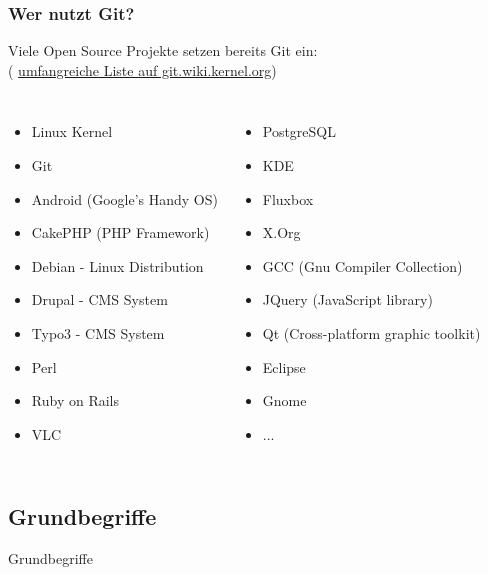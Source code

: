 \documentclass{beamer}
\begin{document}
\begin{frame}\frametitle{Wer nutzt Git?}
Viele Open Source Projekte setzen bereits Git ein: \\
( \href{https://git.wiki.kernel.org/articles/g/i/t/GitProjects_8074.html}{umfangreiche Liste auf git.wiki.kernel.org})
\begin{columns}
                \begin{itemize}                
					\item Linux Kernel
					\item Git
					\item Android (Google's Handy OS) 
					\item CakePHP (PHP Framework) 
					\item Debian - Linux Distribution
					\item Drupal - CMS System
					\item Typo3 - CMS System
					\item Perl
					\item Ruby on Rails
	                \item VLC
                \end{itemize}
                \begin{itemize}
                \item PostgreSQL
                \item KDE
                \item Fluxbox
                \item X.Org
                \item GCC (Gnu Compiler Collection)
                \item JQuery (JavaScript library) 
                \item Qt (Cross-platform graphic toolkit)
                \item Eclipse
                \item Gnome
                \item ...
                \end{itemize}
\end{columns}

\end{frame}

\subsection{Grundbegriffe}
\begin{frame}[c]
\begin{center}
\begin{Huge}
Grundbegriffe
\end{Huge}
\end{center}
\end{frame}
\end{document}
